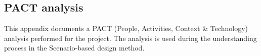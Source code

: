 \subsection{PACT analysis} \label{PACTAnalysis}
This appendix documents a PACT (People, Activities, Context \& Technology) analysis performed for the project. The analysis is used during the understanding process in the Scenario-based design method.